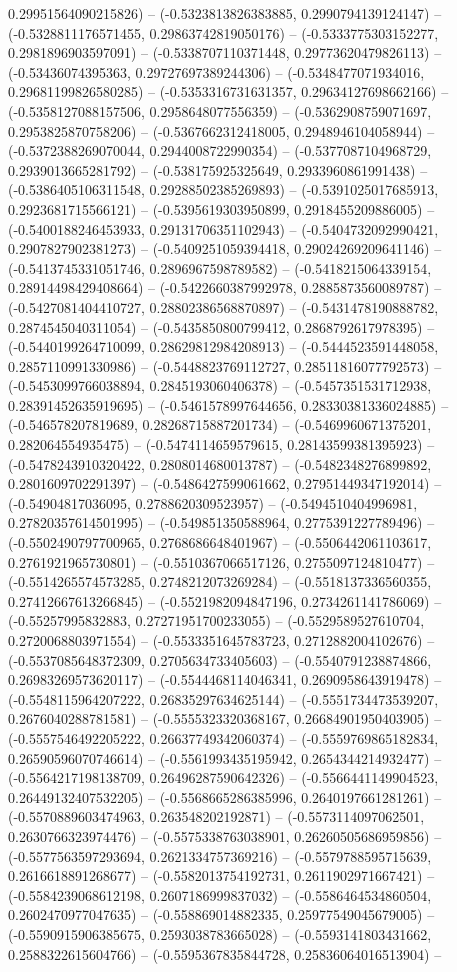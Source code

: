 0.29951564090215826) -- (-0.5323813826383885, 0.2990794139124147) -- (-0.5328811176571455, 0.29863742819050176) -- (-0.5333775303152277, 0.2981896903597091) -- (-0.5338707110371448, 0.29773620479826113) -- (-0.53436074395363, 0.29727697389244306) -- (-0.5348477071934016, 0.29681199826580285) -- (-0.5353316731631357, 0.29634127698662166) -- (-0.5358127088157506, 0.2958648077556359) -- (-0.5362908759071697, 0.2953825870758206) -- (-0.5367662312418005, 0.2948946104058944) -- (-0.5372388269070044, 0.2944008722990354) -- (-0.5377087104968729, 0.2939013665281792) -- (-0.538175925325649, 0.2933960861991438) -- (-0.5386405106311548, 0.29288502385269893) -- (-0.5391025017685913, 0.2923681715566121) -- (-0.5395619303950899, 0.2918455209886005) -- (-0.5400188246453933, 0.29131706351102943) -- (-0.5404732092990421, 0.2907827902381273) -- (-0.5409251059394418, 0.29024269209641146) -- (-0.5413745331051746, 0.2896967598789582) -- (-0.5418215064339154, 0.28914498429408664) -- (-0.5422660387992978, 0.2885873560089787) -- (-0.5427081404410727, 0.28802386568870897) -- (-0.5431478190888782, 0.2874545040311054) -- (-0.5435850800799412, 0.2868792617978395) -- (-0.5440199264710099, 0.28629812984208913) -- (-0.5444523591448058, 0.2857110991330986) -- (-0.5448823769112727, 0.28511816077792573) -- (-0.5453099766038894, 0.2845193060406378) -- (-0.5457351531712938, 0.28391452635919695) -- (-0.5461578997644656, 0.28330381336024885) -- (-0.546578207819689, 0.28268715887201734) -- (-0.5469960671375201, 0.282064554935475) -- (-0.5474114659579615, 0.28143599381395923) -- (-0.5478243910320422, 0.2808014680013787) -- (-0.5482348276899892, 0.2801609702291397) -- (-0.5486427599061662, 0.27951449347192014) -- (-0.54904817036095, 0.2788620309523957) -- (-0.5494510404996981, 0.27820357614501995) -- (-0.549851350588964, 0.2775391227789496) -- (-0.5502490797700965, 0.2768686648401967) -- (-0.5506442061103617, 0.2761921965730801) -- (-0.5510367066517126, 0.2755097124810477) -- (-0.5514265574573285, 0.2748212073269284) -- (-0.5518137336560355, 0.27412667613266845) -- (-0.5521982094847196, 0.2734261141786069) -- (-0.55257995832883, 0.27271951700233055) -- (-0.5529589527610704, 0.2720068803971554) -- (-0.5533351645783723, 0.2712882004102676) -- (-0.5537085648372309, 0.2705634733405603) -- (-0.5540791238874866, 0.26983269573620117) -- (-0.5544468114046341, 0.2690958643919478) -- (-0.5548115964207222, 0.26835297634625144) -- (-0.5551734473539207, 0.2676040288781581) -- (-0.5555323320368167, 0.26684901950403905) -- (-0.5557546492205222, 0.26637749342060374) -- (-0.5559769865182834, 0.26590596070746614) -- (-0.5561993435195942, 0.2654344214932477) -- (-0.5564217198138709, 0.26496287590642326) -- (-0.5566441149904523, 0.26449132407532205) -- (-0.5568665286385996, 0.2640197661281261) -- (-0.5570889603474963, 0.263548202192871) -- (-0.5573114097062501, 0.2630766323974476) -- (-0.5575338763038901, 0.26260505686959856) -- (-0.5577563597293694, 0.2621334757369216) -- (-0.5579788595715639, 0.2616618891268677) -- (-0.5582013754192731, 0.2611902971667421) -- (-0.5584239068612198, 0.2607186999837032) -- (-0.5586464534860504, 0.2602470977047635) -- (-0.558869014882335, 0.25977549045679005) -- (-0.5590915906385675, 0.2593038783665028) -- (-0.5593141803431662, 0.2588322615604766) -- (-0.5595367835844728, 0.25836064016513904) -- 